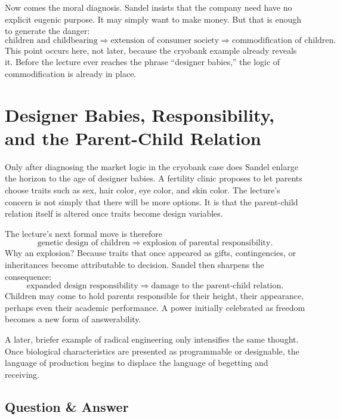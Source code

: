 Now comes the moral diagnosis. Sandel insists that the company need have no explicit eugenic purpose. It may simply want to make money. But that is enough to generate the danger:
\begin{equation}
\text{children and childbearing}
\Longrightarrow
\text{extension of consumer society}
\Longrightarrow
\text{commodification of children}.
\end{equation}
This point occurs here, not later, because the cryobank example already reveals it. Before the lecture ever reaches the phrase ``designer babies,'' the logic of commodification is already in place.

\section{Designer Babies, Responsibility, and the Parent-Child Relation}

Only after diagnosing the market logic in the cryobank case does Sandel enlarge the horizon to the age of designer babies. A fertility clinic proposes to let parents choose traits such as sex, hair color, eye color, and skin color. The lecture's concern is not simply that there will be more options. It is that the parent-child relation itself is altered once traits become design variables.

The lecture's next formal move is therefore
\begin{equation}
\text{genetic design of children}
\Longrightarrow
\text{explosion of parental responsibility}.
\end{equation}
Why an explosion? Because traits that once appeared as gifts, contingencies, or inheritances become attributable to decision. Sandel then sharpens the consequence:
\begin{equation}
\text{expanded design responsibility}
\Longrightarrow
\text{damage to the parent-child relation}.
\end{equation}
Children may come to hold parents responsible for their height, their appearance, perhaps even their academic performance. A power initially celebrated as freedom becomes a new form of answerability.

A later, briefer example of radical engineering only intensifies the same thought. Once biological characteristics are presented as programmable or designable, the language of production begins to displace the language of begetting and receiving.

\subsection{Question \& Answer}

